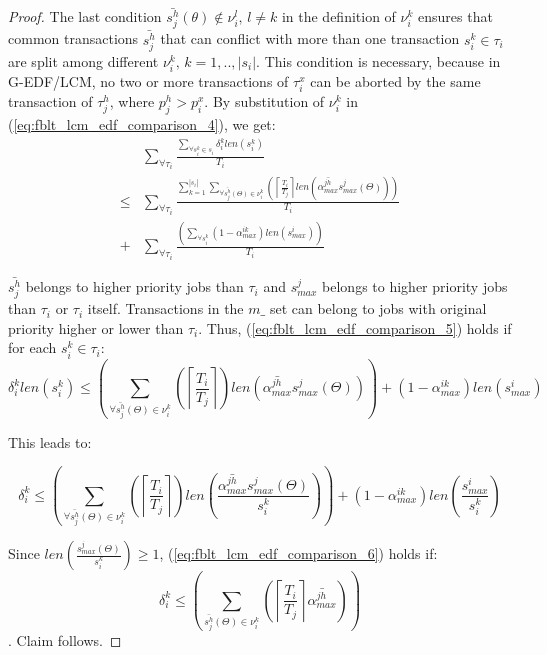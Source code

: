 \documentclass[a4paper,english]{article}
\newtheorem{proof}{Proof}
\begin{document}
\begin{proof}
The last condition $\bar{s_{j}^{h}}(\theta)\not\in\nu_{i}^{l},\, l\ne k$
in the definition of $\nu_{i}^{k}$ ensures that common transactions
$\bar{s_{j}^{h}}$ that can conflict with more than one transaction
$s_{i}^{k}\in\tau_{i}$ are split among different $\nu_{i}^{k},\, k=1,..,|s_{i}|$.
This condition is necessary, because in G-EDF/LCM, no two or more transactions
of $\tau_{i}^{x}$ can be aborted by the same transaction of $\tau_{j}^{h}$, 
where $p_{j}^{h}>p_{i}^{x}$. By substitution of $\nu_{i}^{k}$ in
(\ref{eq:fblt_lcm_edf_comparison_4}), we get:  
\begin{eqnarray}
 & \sum_{\forall\tau_{i}}\frac{\sum_{\forall s_{i}^{k}\in s_{i}}\delta_i^klen(s_{i}^{k})}{T_{i}}\label{eq:fblt_lcm_edf_comparison_5}\\
\le & \sum_{\forall\tau_{i}}\frac{\sum_{k=1}^{|s_{i}|}\sum_{\forall\bar{s_{j}^{h}}(\Theta)\in\nu_{i}^{k}}\left(\left\lceil \frac{T_{i}}{T_{j}}\right\rceil len\left(\bar{\alpha_{max}^{jh}}s_{max}^{j}(\Theta)\right)\right)}{T_{i}}\nonumber \\
+ & \sum_{\forall\tau_{i}}\frac{\left(\sum_{\forall s_{i}^{k}}\left(1-\alpha_{max}^{ik}\right)len\left(s_{max}^{i}\right)\right)}{T_{i}}\nonumber 
\end{eqnarray}

$\bar{s_{j}^{h}}$ belongs to higher priority jobs than $\tau_{i}$
and $s_{max}^{j}$ belongs to higher priority jobs than $\tau_{i}$
or $\tau_{i}$ itself. Transactions in the $m\_$ set can belong to jobs
with original priority higher or lower than $\tau_{i}$. Thus, (\ref{eq:fblt_lcm_edf_comparison_5})
holds if for each $s_{i}^{k}\in\tau_{i}$: 
\[
\delta_i^klen(s_{i}^{k})\le\left(\sum_{\forall\bar{s_{j}^{h}}(\Theta)\in\nu_{i}^{k}}\left(\left\lceil \frac{T_{i}}{T_{j}}\right\rceil \right)len\left(\bar{\alpha_{max}^{jh}}s_{max}^{j}(\Theta)\right)\right)+\left(1-\alpha_{max}^{ik}\right)len\left(s_{max}^{i}\right)
\]

This leads to:

\begin{equation}
\delta_i^k\le\left(\sum_{\forall\bar{s_{j}^{h}}(\Theta)\in\nu_{i}^{k}}\left(\left\lceil \frac{T_{i}}{T_{j}}\right\rceil \right)len\left(\frac{\bar{\alpha_{max}^{jh}}s_{max}^{j}(\Theta)}{s_{i}^{k}}\right)\right)+\left(1-\alpha_{max}^{ik}\right)len\left(\frac{s_{max}^{i}}{s_{i}^{k}}\right)\label{eq:fblt_lcm_edf_comparison_6}
\end{equation}

Since $len\left(\frac{s_{max}^{j}(\Theta)}{s_{i}^{k}}\right)\ge1$, (\ref{eq:fblt_lcm_edf_comparison_6}) holds if: 
\begin{equation*}
\delta_i^k\le\left(\sum_{\bar{s_{j}^{h}}(\Theta)\in\nu_{i}^{k}}\left(\left\lceil \frac{T_{i}}{T_{j}}\right\rceil \bar{\alpha_{max}^{jh}}\right)\right)
\end{equation*}. Claim follows.

\end{proof}
\end{document}
